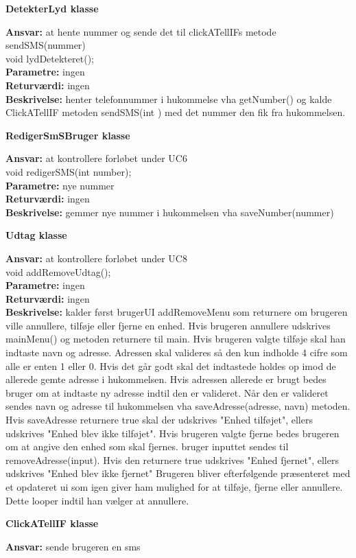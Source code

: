 {\centering 
\textbf{DetekterLyd klasse}\par
}
\textbf{Ansvar:} at hente nummer og sende det til clickATellIFs metode sendSMS(nummer) \\

void lydDetekteret(); \\
\textbf{Parametre:} ingen \\
\textbf{Returværdi:} ingen \\
\textbf{Beskrivelse:} henter telefonnummer i hukommelse vha getNumber() og kalde ClickATellIF metoden sendSMS(int ) med det nummer den fik fra hukommelsen. \\

{\centering 
\textbf{RedigerSmSBruger klasse}\par
}
\textbf{Ansvar:} at kontrollere forløbet under UC6 \\

void redigerSMS(int number); \\
\textbf{Parametre:} nye nummer \\
\textbf{Returværdi:} ingen \\
\textbf{Beskrivelse:} gemmer nye nummer i hukommelsen vha saveNumber(nummer) \\

{\centering 
\textbf{Udtag klasse}\par
}
\textbf{Ansvar:} at kontrollere forløbet under UC8 \\

void addRemoveUdtag(); \\
\textbf{Parametre:} ingen \\
\textbf{Returværdi:} ingen \\
\textbf{Beskrivelse:} kalder først brugerUI addRemoveMenu som returnere om brugeren ville annullere, tilføje eller fjerne en enhed. Hvis brugeren annullere udskrives mainMenu() og metoden returnere til main. 
\newline Hvis brugeren valgte tilføje skal han indtaste navn og adresse. Adressen skal valideres så den kun indholde 4 cifre som alle er enten 1 eller 0. Hvis det går godt skal det indtastede holdes op imod de allerede gemte adresse i hukommelsen. Hvis adressen allerede er brugt bedes bruger om at indtaste ny adresse indtil den er valideret. Når den er valideret sendes navn og adresse til hukommelsen vha saveAdresse(adresse, navn) metoden. Hvis saveAdresse returnere true skal der udskrives "Enhed tilføjet", ellers udskrives "Enhed blev ikke tilføjet".
\newline Hvis brugeren valgte fjerne bedes brugeren om at angive den enhed som skal fjernes. bruger inputtet sendes til removeAdresse(input). Hvis den returnere true udskrives "Enhed fjernet", ellers udskrives "Enhed blev ikke fjernet"
\newline Brugeren bliver efterfølgende præsenteret med et opdateret ui som igen giver ham mulighed for at tilføje, fjerne eller annullere. Dette looper indtil han vælger at annullere.\\
\newpage
{\centering 
\textbf{ClickATellIF klasse}\par
}
\textbf{Ansvar:} sende brugeren en sms \\

